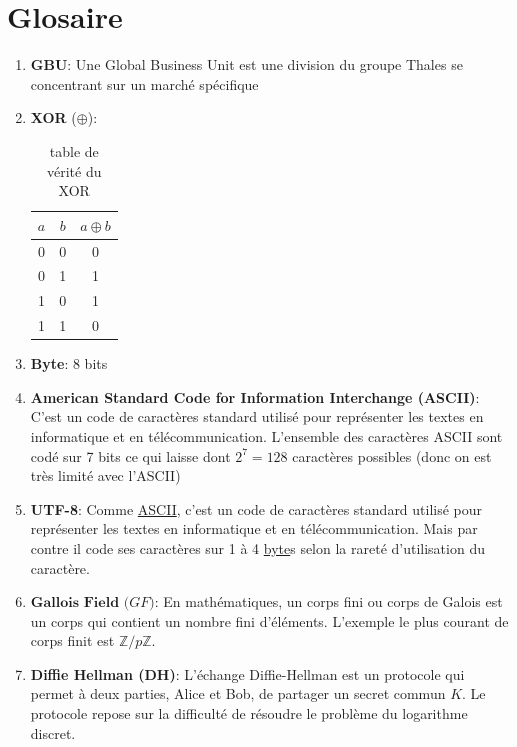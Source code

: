 \documentclass[a4paper, 12pt]{article}
\begin{document}
\section*{Glosaire}
\begin{enumerate}
\item \textbf{GBU}\label{GBU}: Une Global Business Unit est une division du groupe Thales se concentrant sur un marché spécifique
\item \textbf{XOR}\label{XOR} ($\oplus$):\\
	\begin{table}[h]
	\center
	\begin{tabular}{|c|c|c|}
	\hline
		$a$ & $b$ & $a\oplus b$ \\ \hline\hline
		0 & 0 & 0 \\ \hline
		0 & 1 & 1 \\ \hline
		1 & 0 & 1 \\ \hline
		1 & 1 & 0 \\ \hline
	\end{tabular}
	\caption{table de vérité du XOR}
	\label{XOR_table}
	\end{table}
\item \textbf{Byte}\label{byte}: 8 bits	
\item \textbf{American Standard Code for Information Interchange (ASCII)}\label{ASCII}: C'est un code de caractères standard utilisé pour représenter les textes en informatique et en télécommunication. L'ensemble des caractères ASCII sont codé sur 7 bits ce qui laisse dont $2^7 = 128$ caractères possibles (donc on est très limité avec l'ASCII)
\item \textbf{UTF-8}\label{utf}: Comme \hyperref[ASCII]{ASCII}, c'est un code de caractères standard utilisé pour représenter les textes en informatique et en télécommunication. Mais par contre il code ses caractères sur 1 à 4 \hyperref[byte]{byte}s selon la rareté d'utilisation du caractère. 
\item $\textbf{Gallois Field (}GF\textbf{)}$\label{GF}: En mathématiques, un corps fini ou corps de Galois est un corps qui contient un nombre fini d'éléments. L'exemple le plus courant de corps finit est $\mathbb{Z}/p\mathbb{Z}$.
\item \textbf{Diffie Hellman (DH)}\label{DH}: L'échange Diffie-Hellman est un protocole qui permet à deux parties, Alice et Bob, de partager un secret commun $K$. Le protocole repose sur la difficulté de résoudre le problème du logarithme discret. \\


\end{enumerate}
\end{document}
